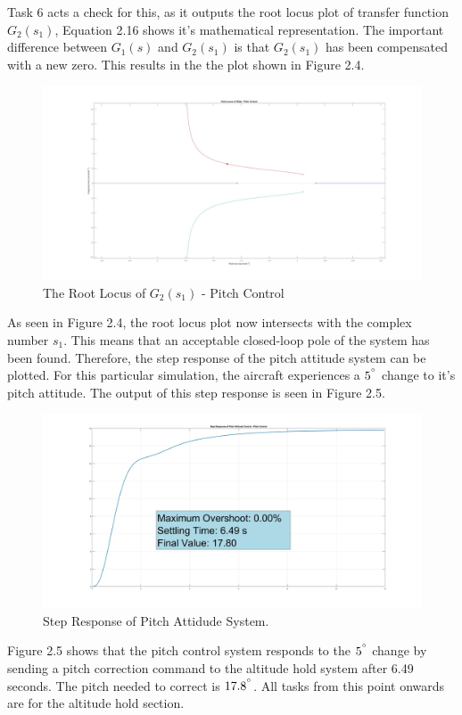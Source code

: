 \documentclass[stu, a4paper, 12pt, floatsintext]{apa7}
\numberwithin{figure}{section}
\numberwithin{table}{section}
\numberwithin{equation}{section}
\begin{document}
Task 6 acts a check for this, as it outputs the root locus plot of transfer function $G_2 (s_1)$, Equation 2.16 shows it's mathematical representation. The important difference between $G_1 (s)$ and $G_2 (s_1)$ is that $G_2 (s_1)$ has been compensated with a new zero. This results in the the plot shown in Figure 2.4.
\begin{figure}[H]
    \caption{The Root Locus of $G_2(s_1)$ - Pitch Control}
    \label{fig:task6_result}
    \centering
    \includegraphics[width=1.0\textwidth]{pictures/Auotpilot/Task6.jpg}
\end{figure}
As seen in Figure 2.4, the root locus plot now intersects with the complex number $s_1$. This means that an acceptable closed-loop pole of the system has been found. Therefore, the step response of the pitch attitude system can be plotted. For this particular simulation, the aircraft experiences a $5^{\degree}$ change to it's pitch attitude. The output of this step response is seen in Figure 2.5.
\begin{figure}[H]
    \caption{Step Response of Pitch Attidude System.}
    \label{fig:task8_result}
    \centering
    \includegraphics[width=1.0\textwidth]{pictures/Auotpilot/Task8.jpg}
\end{figure}
Figure 2.5 shows that the pitch control system responds to the $5^{\degree}$ change by sending a pitch correction command to the altitude hold system after 6.49 seconds. The pitch needed to correct is $17.8^{\degree}$. All tasks from this point onwards are for the altitude hold section. 
\end{document}
